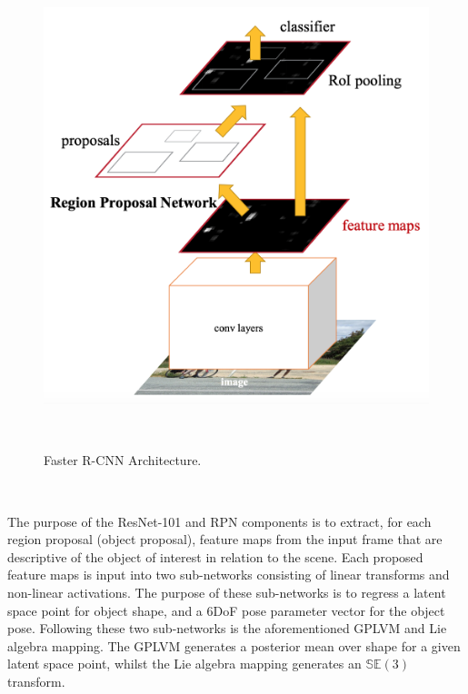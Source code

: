\begin{figure}[!htbp]
  \centering
  \includegraphics[width=.4\linewidth]{figures/spp/rcnn.png}
  \caption[RCNN Architecture]{Faster R-CNN Architecture.\footnotemark}
~\label{figure:spp_rcnn}
\end{figure}
~

The purpose of the ResNet-101 and RPN components is to extract, for each region proposal (object proposal), 
feature maps from the input frame that are descriptive of the object of interest in relation to the scene. 
Each proposed feature maps is input into two sub-networks consisting of linear transforms and non-linear activations. 
The purpose of these sub-networks is to regress a latent space point for object shape, and a 6DoF pose parameter vector 
for the object pose.  Following these two sub-networks is the aforementioned GPLVM and Lie algebra mapping. The 
GPLVM generates a posterior mean over shape for a given latent space point, whilst the 
Lie algebra mapping generates an \( \mathbb{SE}(3) \) transform. 

